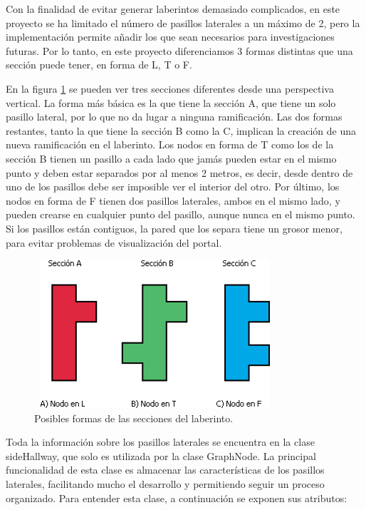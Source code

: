 \documentclass[../main.tex]{subfiles}
\begin{document}
Con la finalidad de evitar generar laberintos demasiado complicados, en este proyecto se ha limitado el número de pasillos laterales a un máximo de 2, pero la implementación permite añadir los que sean necesarios para investigaciones futuras. Por lo tanto, en este proyecto diferenciamos 3 formas distintas que una sección puede tener, en forma de L, T o F.

En la figura \ref{fig:Node_Types} se pueden ver tres secciones diferentes desde una perspectiva vertical. La forma más básica es la que tiene la sección A, que tiene un solo pasillo lateral, por lo que no da lugar a ninguna ramificación. Las dos formas restantes, tanto la que tiene la sección B como la C, implican la creación de una nueva ramificación en el laberinto. Los nodos en forma de T como los de la sección B tienen un pasillo a cada lado que jamás pueden estar en el mismo punto y deben estar separados por al menos 2 metros, es decir, desde dentro de uno de los pasillos debe ser imposible ver el interior del otro. Por último, los nodos en forma de F tienen dos pasillos laterales, ambos en el mismo lado, y pueden crearse en cualquier punto del pasillo, aunque nunca en el mismo punto. Si los pasillos están contiguos, la pared que los separa tiene un grosor menor, para evitar problemas de visualización del portal.

\begin{figure}[h!]
\centering
\includegraphics[width=9cm, height=5.5cm]{imagenes/NodeTypes.png}
\caption{Posibles formas de las secciones del laberinto.}
\label{fig:Node_Types}
\end{figure}

Toda la información sobre los pasillos laterales se encuentra en la clase sideHallway, que solo es utilizada por la clase GraphNode. La principal funcionalidad de esta clase es almacenar las características de los pasillos laterales, facilitando mucho el desarrollo y permitiendo seguir un proceso organizado. Para entender esta clase, a continuación se exponen sus atributos:
\end{document}
